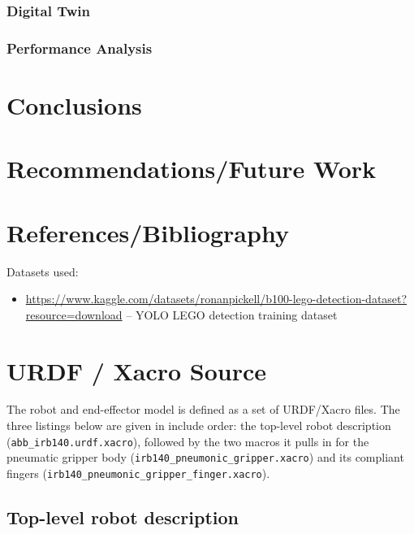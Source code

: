 \documentclass[11pt,a4paper]{report}
\begin{document}
\subsection{Digital Twin}


\subsection{Performance Analysis}


\chapter{Conclusions}

\chapter{Recommendations/Future Work}

\chapter{References/Bibliography}

Datasets used:
\begin{itemize}
  \item \url{https://www.kaggle.com/datasets/ronanpickell/b100-lego-detection-dataset?resource=download} -- YOLO LEGO detection training dataset
\end{itemize}




\appendix

\chapter{URDF / Xacro Source}
\label{app:urdf}

The robot and end-effector model is defined as a set of URDF/Xacro files. The
three listings below are given in include order: the top-level robot description
(\texttt{abb\_irb140.urdf.xacro}), followed by the two macros it pulls in for the
pneumatic gripper body (\texttt{irb140\_pneumonic\_gripper.xacro}) and its
compliant fingers (\texttt{irb140\_pneumonic\_gripper\_finger.xacro}).

\section{Top-level robot description}
\end{document}
